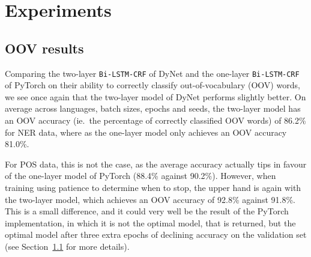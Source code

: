 
\section{Experiments}




\subsection{OOV results}

Comparing the two-layer \texttt{Bi-LSTM-CRF} of DyNet and the one-layer
\texttt{Bi-LSTM-CRF} of PyTorch on their ability to correctly classify
out-of-vocabulary (OOV) words, we see once again that the two-layer model of
DyNet performs slightly better. On average across languages, batch sizes, epochs
and seeds, the two-layer model has an OOV accuracy (ie.\ the percentage of
correctly classified OOV words) of 86.2\% for NER data, where as the one-layer
model only achieves an OOV accuracy 81.0\%.

For POS data, this is not the case, as the average accuracy actually tips in
favour of the one-layer model of PyTorch (88.4\% against 90.2\%). However, when
training using patience to determine when to stop, the upper hand is again with
the two-layer model, which achieves an OOV accuracy of 92.8\% against 91.8\%.
This is a small difference, and it could very well be the result of the PyTorch
implementation, in which it is not the optimal model, that is returned, but the
optimal model after three extra epochs of declining accuracy on the validation
set (see Section~\ref{} for more details).

